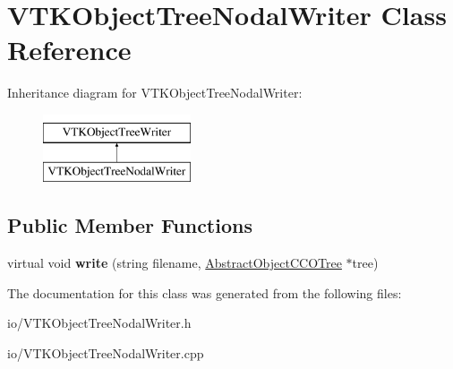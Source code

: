 \hypertarget{class_v_t_k_object_tree_nodal_writer}{}\section{V\+T\+K\+Object\+Tree\+Nodal\+Writer Class Reference}
\label{class_v_t_k_object_tree_nodal_writer}
Inheritance diagram for V\+T\+K\+Object\+Tree\+Nodal\+Writer\+:\begin{figure}[H]
\begin{center}
\leavevmode
\includegraphics[height=2.000000cm]{df/d43/class_v_t_k_object_tree_nodal_writer}
\end{center}
\end{figure}
\subsection*{Public Member Functions}
\begin{DoxyCompactItemize}
\item 
virtual void {\bfseries write} (string filename, \hyperlink{class_abstract_object_c_c_o_tree}{Abstract\+Object\+C\+C\+O\+Tree} $\ast$tree)\hypertarget{class_v_t_k_object_tree_nodal_writer_ae468d7d7b2185e089d1574c311ceaebd}{}\label{class_v_t_k_object_tree_nodal_writer_ae468d7d7b2185e089d1574c311ceaebd}

\end{DoxyCompactItemize}


The documentation for this class was generated from the following files\+:\begin{DoxyCompactItemize}
\item 
io/V\+T\+K\+Object\+Tree\+Nodal\+Writer.\+h\item 
io/V\+T\+K\+Object\+Tree\+Nodal\+Writer.\+cpp\end{DoxyCompactItemize}

